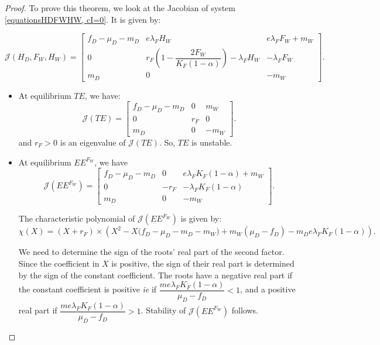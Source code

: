 \documentclass{article}
\newcommand{\lfw}{\lambda_{F}}
\newcommand{\lfw}{\lambda_{F}}
\begin{document}
\begin{proof}
To prove this theorem, we look at the Jacobian of system \eqref{equationsHDFWHW, cI=0}. It is given by:

\begin{equation*}
\mathcal{J}(H_D, F_W, H_W) = \begin{bmatrix}
f_D-\mu_D - m_D & e \lfw H_W & e\lfw F_W + m_W \\
0 & r_F \left( 1 - \dfrac{2F_W}{K_F(1-\alpha)} \right) - \lfw H_W & - \lfw F_W \\
m_D & 0 & -m_W
\end{bmatrix}.
\end{equation*}

\begin{itemize}
\item At equilibrium $TE$, we have:
\begin{equation*}
\mathcal{J}(TE) = \begin{bmatrix}
f_D-\mu_D - m_D & 0 &  m_W \\
0 & r_F  &  0\\
m_D & 0 & -m_W
\end{bmatrix}.
\end{equation*}
and $r_F > 0$ is an eigenvalue of $\mathcal{J}(TE)$. So, $TE$ is unstable.
\item At equilibrium $EE^{F_W}$, we have
\begin{equation*}
\mathcal{J}(EE^{F_W}) = \begin{bmatrix}
f_D-\mu_D - m_D & 0 & e\lfw K_F(1-\alpha) + m_W \\
0 & -r_F  & -\lfw K_F(1-\alpha)  \\
m_D & 0 & -m_W
\end{bmatrix}.
\end{equation*}

The characteristic polynomial of $\mathcal{J}(EE^{F_W})$ is given by:
\begin{equation*}
\chi(X) = (X +r_F) \times \left(X^2 - X\Big(f_D - \mu_D - m_D - m_W \Big) + m_W(\mu_D - f_D) - m_D e \lfw K_F(1-\alpha) \right).
\end{equation*}

We need to determine the sign of the roots' real part of the second factor. Since the coefficient in $X$ is positive, the sign of their real part is determined by the sign of the constant coefficient.
The roots have a negative real part if the constant coefficient is positive \textit{ie} if $\dfrac{m e \lfw K_F(1-\alpha)}{\mu_D - f_D} < 1 $, and a positive real part if $\dfrac{m e \lfw K_F(1-\alpha)}{\mu_D - f_D} > 1 $. Stability of $\mathcal{J}(EE^{F_W})$ follows.


\end{itemize}
\end{proof}
\end{document}
